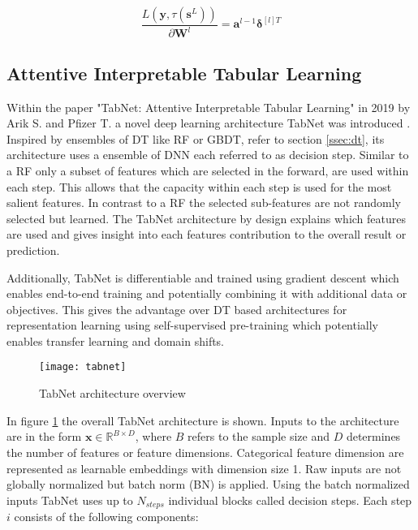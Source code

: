 \documentclass[../main.tex]{subfiles}
\begin{document}
\begin{equation}
    \frac{L(\mathbf{y}, \tau(\mathbf{s}^L))}{\partial \mathbf{W}^l} = \mathbf{a}^{l-1}\mathbf{\delta}^{[l] T}
\end{equation}

\newpage

\subsection{Attentive Interpretable Tabular Learning} \label{ssec:tabnet}

Within the paper "TabNet: Attentive Interpretable Tabular Learning" in 2019 by Arik S. and Pfizer T. a novel deep learning architecture TabNet was introduced \cite{arik_tabnet_2020}. Inspired by ensembles of DT like RF or GBDT, refer to section \ref{ssec:dt}, its architecture uses a ensemble of DNN each referred to as decision step. Similar to a RF only a subset of features which are selected in the forward, are used within each step. This allows that the capacity within each step is used for the most salient features. In contrast to a RF the selected sub-features are not randomly selected but learned. The TabNet architecture by design explains which features are used and gives insight into each features contribution to the overall result or prediction. 

Additionally, TabNet is differentiable and trained using gradient descent which enables end-to-end training and potentially combining it with additional data or objectives. This gives the advantage over DT based architectures for representation learning using self-supervised pre-training which potentially enables transfer learning and domain shifts. 

\begin{figure}[H]
    \centering
    \texttt{[image: tabnet]}    
    \caption{TabNet architecture overview}
    \label{fig:tabnet}
\end{figure}

In figure \ref{fig:tabnet} the overall TabNet architecture is shown. Inputs to the architecture are in the form $\mathbf{x} \in \mathbb{R}^{B \times D}$, where $B$ refers to the sample size and $D$ determines the number of features or feature dimensions.  Categorical feature dimension are represented as learnable embeddings with dimension size 1. Raw inputs are not globally normalized but batch norm (BN) \cite{ioffe_batch_2015} is applied. Using the batch normalized inputs TabNet uses up to $N_{steps}$ individual blocks called decision steps. Each step $i$ consists of the following components:
\end{document}
